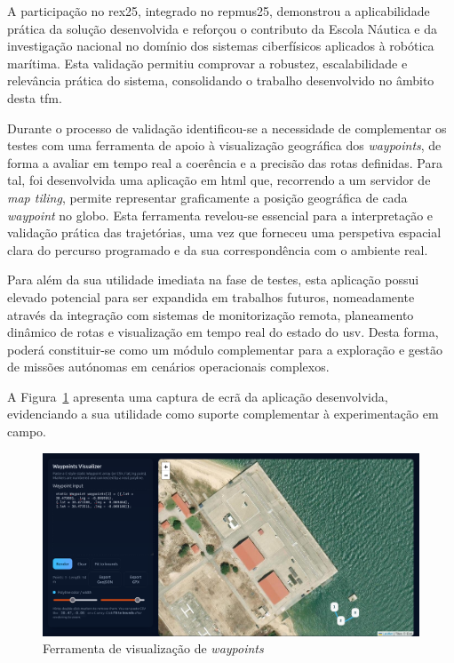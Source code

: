 A participação no \gls{rex25}, integrado no \gls{repmus25}, demonstrou a aplicabilidade prática da solução desenvolvida e reforçou o contributo da Escola Náutica e da investigação nacional no domínio dos sistemas ciberfísicos aplicados à robótica marítima. Esta validação permitiu comprovar a robustez, escalabilidade e relevância prática do sistema, consolidando o trabalho desenvolvido no âmbito desta \gls{tfm}.

Durante o processo de validação identificou-se a necessidade de complementar os testes com uma ferramenta de apoio à visualização geográfica dos \emph{waypoints}, de forma a avaliar em tempo real a coerência e a precisão das rotas definidas. Para tal, foi desenvolvida uma aplicação em \gls{html} que, recorrendo a um servidor de \emph{map tiling}, permite representar graficamente a posição geográfica de cada \emph{waypoint} no globo. Esta ferramenta revelou-se essencial para a interpretação e validação prática das trajetórias, uma vez que forneceu uma perspetiva espacial clara do percurso programado e da sua correspondência com o ambiente real.  

Para além da sua utilidade imediata na fase de testes, esta aplicação possui elevado potencial para ser expandida em trabalhos futuros, nomeadamente através da integração com sistemas de monitorização remota, planeamento dinâmico de rotas e visualização em tempo real do estado do \gls{usv}. Desta forma, poderá constituir-se como um módulo complementar para a exploração e gestão de missões autónomas em cenários operacionais complexos.  

A Figura~\ref{fig:html} apresenta uma captura de ecrã da aplicação desenvolvida, evidenciando a sua utilidade como suporte complementar à experimentação em campo.


\begin{figure}[H]
    \centering
    \includegraphics[width=1\linewidth]{figuras/waypoint-html.png}
    \caption{Ferramenta de visualização de \emph{waypoints}}
    \label{fig:html}
\end{figure}

